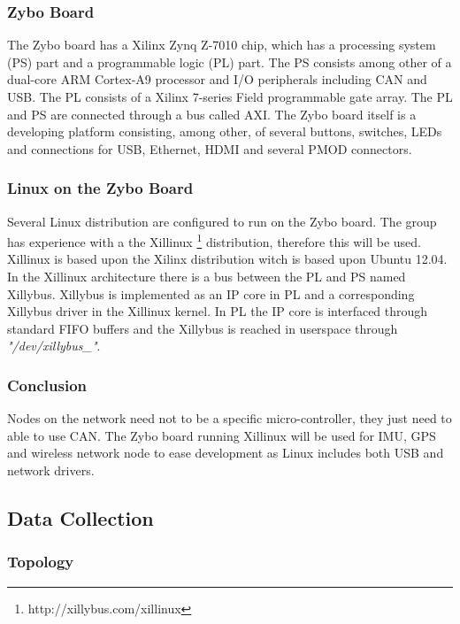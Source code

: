 \subsubsection*{Zybo Board}
The Zybo board has a Xilinx Zynq Z-7010 chip, which has a processing system (PS) part and a programmable logic (PL) part.
The PS consists among other of a dual-core ARM Cortex-A9 processor and I/O peripherals including CAN and USB.
The PL consists of a Xilinx 7-series Field programmable gate array. 
The PL and PS are connected through a bus called AXI.
The Zybo board itself is a developing platform consisting, among other, of several buttons, switches, LEDs and connections for USB, Ethernet, HDMI and several PMOD connectors.


\subsubsection*{Linux on the Zybo Board}
Several Linux distribution are configured to run on the Zybo board. 
The group has experience with a the Xillinux \footnote{http://xillybus.com/xillinux} distribution, therefore this will be used.
Xillinux is based upon the Xilinx distribution witch is based upon Ubuntu 12.04.
In the Xillinux architecture there is a bus between the PL and PS named Xillybus.
Xillybus is implemented as an IP core in PL and a corresponding Xillybus driver in the Xillinux kernel.
In PL the IP core is interfaced through standard FIFO buffers and the Xillybus is reached in userspace through \textit{"/dev/xillybus\_"}.

\subsubsection*{Conclusion}
Nodes on the network need not to be a specific micro-controller, they just need to able to use CAN.
The Zybo board running Xillinux will be used for IMU, GPS and wireless network node to ease development as Linux includes both USB and network drivers. 


\subsection{Data Collection}
\label{sec:data_collection}
\subsubsection{Topology}

